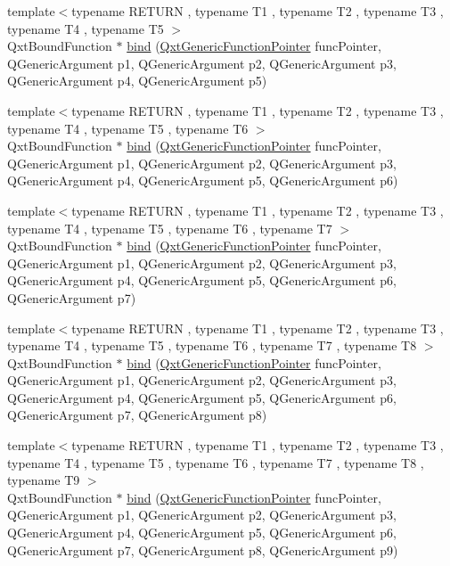 \begin{DoxyCompactItemize}
\item 
{\footnotesize template$<$typename R\-E\-T\-U\-R\-N , typename T1 , typename T2 , typename T3 , typename T4 , typename T5 $>$ }\\Qxt\-Bound\-Function $\ast$ \hyperlink{namespace_qxt_meta_object_a441c0575d96ea05e09e7458378d711a4}{bind} (\hyperlink{class_qxt_generic_function_pointer}{Qxt\-Generic\-Function\-Pointer} func\-Pointer, Q\-Generic\-Argument p1, Q\-Generic\-Argument p2, Q\-Generic\-Argument p3, Q\-Generic\-Argument p4, Q\-Generic\-Argument p5)
\item 
{\footnotesize template$<$typename R\-E\-T\-U\-R\-N , typename T1 , typename T2 , typename T3 , typename T4 , typename T5 , typename T6 $>$ }\\Qxt\-Bound\-Function $\ast$ \hyperlink{namespace_qxt_meta_object_ad90027e520fc7a224c6e04918c53f89b}{bind} (\hyperlink{class_qxt_generic_function_pointer}{Qxt\-Generic\-Function\-Pointer} func\-Pointer, Q\-Generic\-Argument p1, Q\-Generic\-Argument p2, Q\-Generic\-Argument p3, Q\-Generic\-Argument p4, Q\-Generic\-Argument p5, Q\-Generic\-Argument p6)
\item 
{\footnotesize template$<$typename R\-E\-T\-U\-R\-N , typename T1 , typename T2 , typename T3 , typename T4 , typename T5 , typename T6 , typename T7 $>$ }\\Qxt\-Bound\-Function $\ast$ \hyperlink{namespace_qxt_meta_object_ac697364554ebc5db9a376c1ad202184b}{bind} (\hyperlink{class_qxt_generic_function_pointer}{Qxt\-Generic\-Function\-Pointer} func\-Pointer, Q\-Generic\-Argument p1, Q\-Generic\-Argument p2, Q\-Generic\-Argument p3, Q\-Generic\-Argument p4, Q\-Generic\-Argument p5, Q\-Generic\-Argument p6, Q\-Generic\-Argument p7)
\item 
{\footnotesize template$<$typename R\-E\-T\-U\-R\-N , typename T1 , typename T2 , typename T3 , typename T4 , typename T5 , typename T6 , typename T7 , typename T8 $>$ }\\Qxt\-Bound\-Function $\ast$ \hyperlink{namespace_qxt_meta_object_ab13263040ab85e89a3097221b47f057d}{bind} (\hyperlink{class_qxt_generic_function_pointer}{Qxt\-Generic\-Function\-Pointer} func\-Pointer, Q\-Generic\-Argument p1, Q\-Generic\-Argument p2, Q\-Generic\-Argument p3, Q\-Generic\-Argument p4, Q\-Generic\-Argument p5, Q\-Generic\-Argument p6, Q\-Generic\-Argument p7, Q\-Generic\-Argument p8)
\item 
{\footnotesize template$<$typename R\-E\-T\-U\-R\-N , typename T1 , typename T2 , typename T3 , typename T4 , typename T5 , typename T6 , typename T7 , typename T8 , typename T9 $>$ }\\Qxt\-Bound\-Function $\ast$ \hyperlink{namespace_qxt_meta_object_a81e558fab997dec67588120dc4063075}{bind} (\hyperlink{class_qxt_generic_function_pointer}{Qxt\-Generic\-Function\-Pointer} func\-Pointer, Q\-Generic\-Argument p1, Q\-Generic\-Argument p2, Q\-Generic\-Argument p3, Q\-Generic\-Argument p4, Q\-Generic\-Argument p5, Q\-Generic\-Argument p6, Q\-Generic\-Argument p7, Q\-Generic\-Argument p8, Q\-Generic\-Argument p9)

\end{DoxyCompactItemize}
